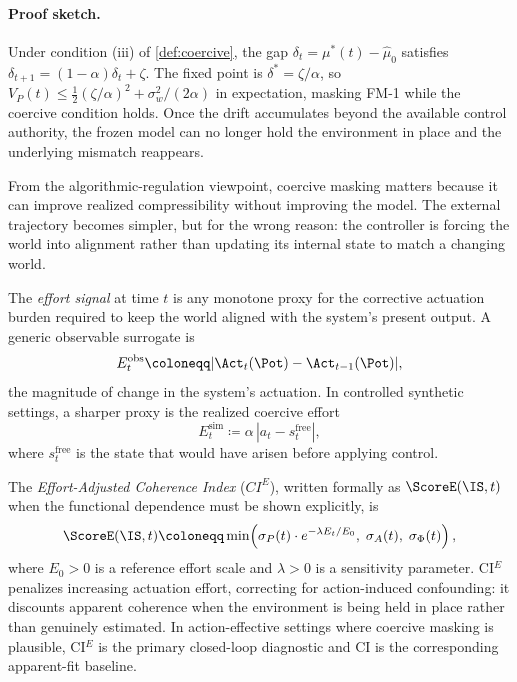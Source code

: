 \paragraph{Proof sketch.}
Under condition (iii) of \cref{def:coercive}, the gap
$\delta_t = \mu^*(t) - \hat\mu_0$ satisfies
$\delta_{t+1} = (1 - \alpha)\delta_t + \zeta$. The fixed point is
$\delta^* = \zeta / \alpha$, so
$V_P(t) \leq \tfrac{1}{2}(\zeta/\alpha)^2 + \sigma_w^2/(2\alpha)$ in
expectation, masking FM-1 while the coercive condition holds. Once the drift
accumulates beyond the available control authority, the frozen model can no
longer hold the environment in place and the underlying mismatch reappears.

\begin{remark}
From the algorithmic-regulation viewpoint, coercive masking matters because it
can improve realized compressibility without improving the model. The external
trajectory becomes simpler, but for the wrong reason: the controller is forcing
the world into alignment rather than updating its internal state to match a
changing world.
\end{remark}

\begin{definition}\label{def:tci_effort}
The \emph{effort signal} at time $t$ is any monotone proxy for the corrective
actuation burden required to keep the world aligned with the system's present
output. A generic observable surrogate is
\[
  E_t^{\mathrm{obs}} \coloneqq |\Act_t(\Pot) - \Act_{t-1}(\Pot)|,
\]
the magnitude of change in the system's actuation. In controlled synthetic
settings, a sharper proxy is the realized coercive effort
\[
  E_t^{\mathrm{sim}} \coloneqq \alpha\,|a_t - s_t^{\mathrm{free}}|,
\]
where $s_t^{\mathrm{free}}$ is the state that would have arisen before applying
control.

The \emph{Effort-Adjusted Coherence Index} ($CI^E$), written formally as
$\ScoreE(\IS,t)$ when the functional dependence must be shown explicitly, is
\[
  \ScoreE(\IS,t)
  \coloneqq
  \min\!\left(
    \sigma_P(t) \cdot e^{-\lambda E_t / E_0},\;
    \sigma_A(t),\;
    \sigma_\Phi(t)
  \right),
\]
where $E_0 > 0$ is a reference effort scale and $\lambda > 0$ is a
sensitivity parameter. CI$^E$ penalizes increasing actuation effort,
correcting for action-induced confounding: it discounts apparent coherence when
the environment is being held in place rather than genuinely estimated. In
action-effective settings where coercive masking is plausible, CI$^E$ is the
primary closed-loop diagnostic and CI is the corresponding apparent-fit
baseline.
\end{definition}

